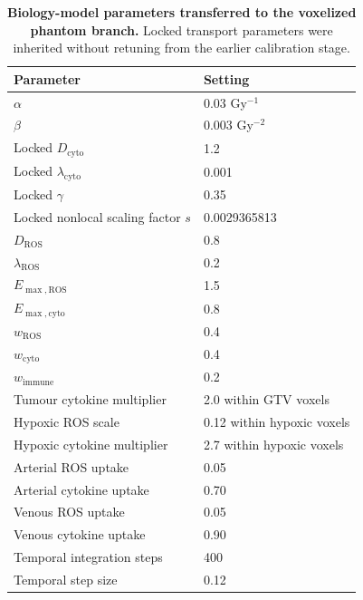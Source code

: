 \begin{table}[H]
\centering
\caption{\textbf{Biology-model parameters transferred to the voxelized phantom branch.} Locked transport parameters were inherited without retuning from the earlier calibration stage.}
\label{tab:bioaware_parameters}
\small
\begin{tabular}{p{5.4cm}p{7.2cm}}
\toprule
Parameter & Setting \\
\midrule
$\alpha$ & 0.03 Gy$^{-1}$ \\
$\beta$ & 0.003 Gy$^{-2}$ \\
Locked $D_{\mathrm{cyto}}$ & 1.2 \\
Locked $\lambda_{\mathrm{cyto}}$ & 0.001 \\
Locked $\gamma$ & 0.35 \\
Locked nonlocal scaling factor $s$ & 0.0029365813 \\
$D_{\mathrm{ROS}}$ & 0.8 \\
$\lambda_{\mathrm{ROS}}$ & 0.2 \\
$E_{\max,\mathrm{ROS}}$ & 1.5 \\
$E_{\max,\mathrm{cyto}}$ & 0.8 \\
$w_{\mathrm{ROS}}$ & 0.4 \\
$w_{\mathrm{cyto}}$ & 0.4 \\
$w_{\mathrm{immune}}$ & 0.2 \\
Tumour cytokine multiplier & 2.0 within GTV voxels \\
Hypoxic ROS scale & 0.12 within hypoxic voxels \\
Hypoxic cytokine multiplier & 2.7 within hypoxic voxels \\
Arterial ROS uptake & 0.05 \\
Arterial cytokine uptake & 0.70 \\
Venous ROS uptake & 0.05 \\
Venous cytokine uptake & 0.90 \\
Temporal integration steps & 400 \\
Temporal step size & 0.12 \\
\bottomrule
\end{tabular}
\end{table}
